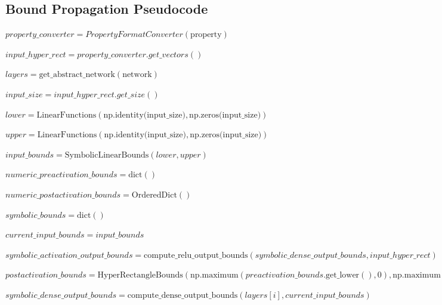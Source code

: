\subsection{Bound Propagation Pseudocode}
\begin{algorithm}[t!]
  \caption{Bound Propagation Algorithm}
  \label{alg:bp-pseudocode}
  \small
\begin{algorithmic}[1]
    		\State {}
   		 \State $property\_converter = {PropertyFormatConverter}(\text{property})$
    
    		\State $input\_hyper\_rect = property\_converter.get\_vectors()$
    
    		\State $layers = \text{get\_abstract\_network}(\text{network})$
    
   		\State $input\_size = input\_hyper\_rect.get\_size()$
    
    		\State $lower = \text{LinearFunctions}(\text{np.identity(input\_size)}, \text{np.zeros(input\_size)})$
    
    		\State $upper = \text{LinearFunctions}(\text{np.identity(input\_size)}, \text{np.zeros(input\_size)})$
    
    		\State $input\_bounds = \text{SymbolicLinearBounds}(lower, upper)$
    
    		\State $numeric\_preactivation\_bounds = \text{dict}()$
    
   		\State $numeric\_postactivation\_bounds = \text{OrderedDict}()$
    
    		\State $symbolic\_bounds = \text{dict}()$
    
    		\State $current\_input\_bounds = input\_bounds$
    
    
            			\State $symbolic\_activation\_output\_bounds = \text{compute\_relu\_output\_bounds}(symbolic\_dense\_output\_bounds, input\_hyper\_rect)$
            
            			\State $postactivation\_bounds = \text{HyperRectangleBounds}(\text{np.maximum}(preactivation\_bounds.\text{get\_lower}(), 0), 							\text{np.maximum}(preactivation\_bounds.\text{get\_upper}(), 0))$
            
            			\State $symbolic\_dense\_output\_bounds = \text{compute\_dense\_output\_bounds}(layers[i], current\_input\_bounds)$
            

\end{algorithmic}
\end{algorithm}
